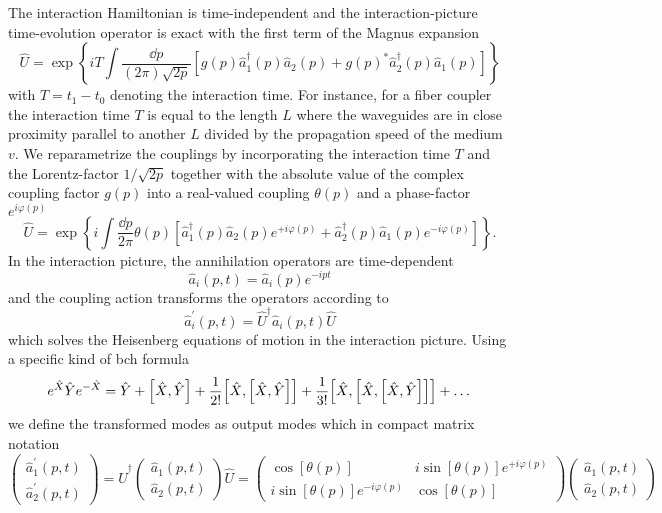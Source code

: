 The interaction Hamiltonian is time-independent and the interaction-picture time-evolution operator is exact with the first term of the Magnus expansion
\begin{equation}
	\hat{U}
	=
	\exp\left\{
		iT
		\int\frac{\dd{p}}{(2\pi)\sqrt{2p}}
		\left[
			g(p)
			\hat{a}_1^\dagger(p)
			\hat{a}_2(p)
			+
			g(p)^*
			\hat{a}_2^\dagger(p)
			\hat{a}_1(p)
		\right]
	\right\}
\end{equation}
with $T=t_1-t_0$ denoting the interaction time.
For instance, for a fiber coupler the interaction time $T$ is equal to the length $L$ where the waveguides are in close proximity parallel to another $L$ divided by the propagation speed of the medium $v$.
We reparametrize the couplings by incorporating the interaction time $T$ and the Lorentz-factor $1/\sqrt{2p}$ together with the absolute value of the complex coupling factor $g(p)$ into a real-valued coupling $\theta(p)$ and a phase-factor $e^{i\varphi(p)}$
\begin{equation}
	\hat{U}
	=
	\exp\left\{
		i
		\int\frac{\dd{p}}{2\pi}
		\theta(p)
		\left[
			\hat{a}_1^\dagger(p)
			\hat{a}_2(p)
			e^{+i\varphi(p)}
			+
			\hat{a}_2^\dagger(p)
			\hat{a}_1(p)
			e^{-i\varphi(p)}
		\right]
	\right\}
	.
\end{equation}
In the interaction picture, the annihilation operators are time-dependent
\begin{equation}
	\hat{a}_i(p,t)
	=
	\hat{a}_i(p)e^{-ipt}
\end{equation}
and the coupling action transforms the operators according to
\begin{equation}
	\hat{a}_i^\prime(p,t)
	=
	\hat{U}^\dagger
	\hat{a}_i(p,t)
	\hat{U}
\end{equation}
which solves the Heisenberg equations of motion in the interaction picture.
Using a specific kind of \gls{bch} formula
\begin{equation}
	e^{\hat{X}}
	\hat{Y}
	e^{-\hat{X}}
	=
	\hat{Y}
	+
	\comm{\hat{X}}{\hat{Y}}
	+
	\frac{1}{2!}
	\comm{\hat{X}}{\comm{\hat{X}}{\hat{Y}}}
	+
	\frac{1}{3!}
	\comm{\hat{X}}{\comm{\hat{X}}{\comm{\hat{X}}{\hat{Y}}}}
	+
	\dots
\end{equation}
we define the transformed modes as output modes which in compact matrix notation
\begin{equation}
	\begin{pmatrix}
		\hat{a}_1^\prime(p,t)
		\\
		\hat{a}_2^\prime(p,t)
	\end{pmatrix}
	=
	\hat{U}^\dagger
	\begin{pmatrix}
		\hat{a}_1(p,t)
		\\
		\hat{a}_2(p,t)
	\end{pmatrix}
	\hat{U}
	=
	\begin{pmatrix}
		\cos[\theta(p)] & i\sin[\theta(p)]e^{+i\varphi(p)}
		\\
		i\sin[\theta(p)]e^{-i\varphi(p)} & \cos[\theta(p)]
	\end{pmatrix}
	\begin{pmatrix}
		\hat{a}_1(p,t)
		\\
		\hat{a}_2(p,t)
	\end{pmatrix}
\end{equation}

